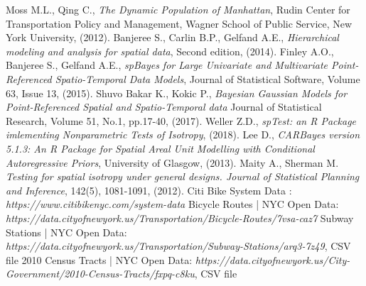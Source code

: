 \documentclass[12pt]{article}
\begin{document}
\begin{flushleft}
	\begin{thebibliography}{9}
	Moss M.L., Qing C.,
	\textit{The Dynamic Population of Manhattan},
	Rudin Center for Transportation Policy and Management,	
	Wagner School of Public Service,
	New York University,
	(2012).
	Banjeree S., Carlin B.P., Gelfand A.E.,
	\textit{Hierarchical modeling and analysis for spatial data},
	Second edition,
	(2014).
	Finley A.O., Banjeree S., Gelfand A.E.,
	\textit{spBayes for Large Univariate and Multivariate Point-Referenced Spatio-Temporal Data Models},
	Journal of Statistical Software,
	Volume 63, Issue 13,
	(2015).
	Shuvo Bakar K., Kokic P.,
	\textit{Bayesian Gaussian Models for Point-Referenced Spatial and Spatio-Temporal data}
	Journal of Statistical Research,
	Volume 51, No.1, pp.17-40,
	(2017).
	Weller Z.D.,
	\textit{spTest: an R Package imlementing Nonparametric Tests of Isotropy},
	(2018).
	Lee D.,
	\textit{CARBayes version 5.1.3: An R Package for Spatial Areal Unit Modelling with Conditional Autoregressive Priors},
	University of Glasgow,
	(2013).
	Maity A., Sherman M.
	\textit{Testing for spatial isotropy under general designs. Journal of Statistical Planning and Inference}, 
	142(5), 1081-1091,
	(2012).
	Citi Bike System Data : \emph{https://www.citibikenyc.com/system-data}
	Bicycle Routes | NYC Open Data: \emph{https://data.cityofnewyork.us/Transportation/Bicycle-Routes/7vsa-caz7}
	Subway Stations | NYC Open Data:
	\emph{https://data.cityofnewyork.us/Transportation/Subway-Stations/arq3-7z49},
	CSV file
	2010 Census Tracts | NYC Open Data:
	\emph{https://data.cityofnewyork.us/City-Government/2010-Census-Tracts/fxpq-c8ku},
	CSV file
	
	
\end{thebibliography}

\end{flushleft}
\end{document}
